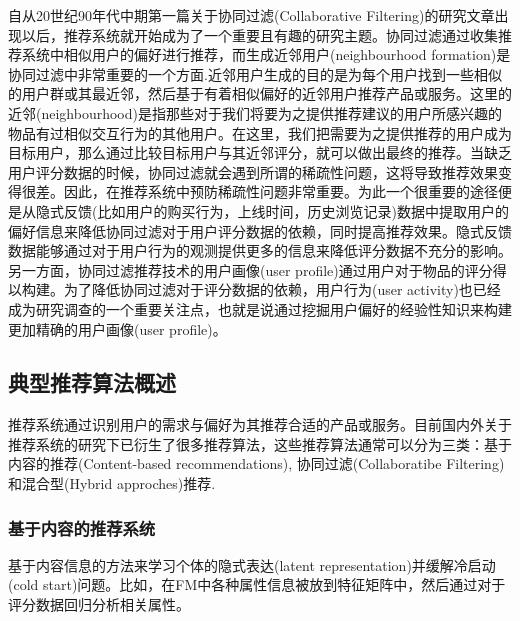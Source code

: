 自从20世纪90年代中期第一篇关于协同过滤(Collaborative Filtering)的研究文章\cite{DBLP:conf/sigmod/AnkerstBKS99}出现以后，推荐系统就开始成为了一个重要且有趣的研究主题。协同过滤通过收集推荐系统中相似用户的偏好进行推荐，而生成近邻用户(neighbourhood formation)是协同过滤中非常重要的一个方面\cite{DBLP:journals/pvldb/BoghSJ13}.近邻用户生成的目的是为每个用户找到一些相似的用户群或其最近邻，然后基于有着相似偏好的近邻用户推荐产品或服务\cite{DBLP:journals/eswa/ZhengL11,DBLP:journals/ecra/ChoiYKS12}。这里的近邻(neighbourhood)是指那些对于我们将要为之提供推荐建议的用户所感兴趣的物品有过相似交互行为的其他用户。在这里，我们把需要为之提供推荐的用户成为目标用户，那么通过比较目标用户与其近邻评分，就可以做出最终的推荐\cite{DBLP:journals/eswa/AcilarA09,kim2011recommender}。当缺乏用户评分数据的时候，协同过滤就会遇到所谓的稀疏性问题，这将导致推荐效果变得很差。因此，在推荐系统中预防稀疏性问题非常重要。为此一个很重要的途径便是从隐式反馈(比如用户的购买行为，上线时间，历史浏览记录)数据中提取用户的偏好信息来降低协同过滤对于用户评分数据的依赖，同时提高推荐效果\cite{DBLP:conf/icdm/HuKV08,DBLP:journals/eswa/AlbadviS09}。隐式反馈数据能够通过对于用户行为的观测提供更多的信息来降低评分数据不充分的影响\cite{rafeh2012adaptive,DBLP:journals/eswa/ZhengL11}。另一方面，协同过滤推荐技术的用户画像(user profile)通过用户对于物品的评分得以构建。为了降低协同过滤对于评分数据的依赖，用户行为(user activity)也已经成为研究调查的一个重要关注点，也就是说通过挖掘用户偏好的经验性知识来构建更加精确的用户画像(user profile)\cite{lee2010collaborative,DBLP:journals/eswa/ZhengL11,kim2011recommender,DBLP:journals/ecra/ChoiYKS12}。




\subsection{典型推荐算法概述}

推荐系统通过识别用户的需求与偏好为其推荐合适的产品或服务。目前国内外关于推荐系统的研究下已衍生了很多推荐算法，这些推荐算法通常可以分为三类：基于内容的推荐(Content-based recommendations), 协同过滤(Collaboratibe Filtering)和混合型(Hybrid approches)推荐.
 
 
\subsubsection{基于内容的推荐系统}

基于内容信息的方法\cite{gantner2010learning,rendle2012factorization,hong2013co}来学习个体的隐式表达(latent representation)并缓解冷启动(cold start)问题。比如，在FM\cite{rendle2012factorization}中各种属性信息被放到特征矩阵中，然后通过对于评分数据回归分析相关属性。


